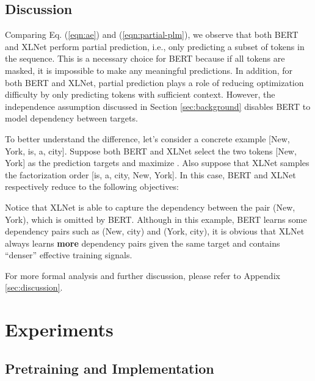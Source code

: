\documentclass{article}
\begin{document}
\subsection{Discussion}

Comparing Eq. (\ref{eqn:ae}) and (\ref{eqn:partial-plm}), we observe that both BERT and XLNet perform partial prediction, i.e., only predicting a subset of tokens in the sequence. 
This is a necessary choice for BERT because if all tokens are masked, it is impossible to make any meaningful predictions. 
In addition, for both BERT and XLNet, partial prediction plays a role of reducing optimization difficulty by only predicting tokens with sufficient context. 
However, the independence assumption discussed in Section \ref{sec:background} disables BERT to model dependency between targets.

To better understand the difference, let's consider a concrete example [New, York, is, a, city]. Suppose both BERT and XLNet select the two tokens [New, York] as the prediction targets and maximize . Also suppose that XLNet samples the factorization order [is, a, city, New, York]. In this case, BERT and XLNet respectively reduce to the following objectives:


Notice that XLNet is able to capture the dependency between the pair (New, York), which is omitted by BERT. 
Although in this example, BERT learns some dependency pairs such as (New, city) and (York, city), it is obvious that XLNet always learns \textbf{more} dependency pairs given the same target and contains ``denser'' effective training signals.

For more formal analysis and further discussion, please refer to Appendix \ref{sec:discussion}.















 










\section{Experiments} \label{sec:exp}



\subsection{Pretraining and Implementation}
\label{sec:implementation}
\end{document}

